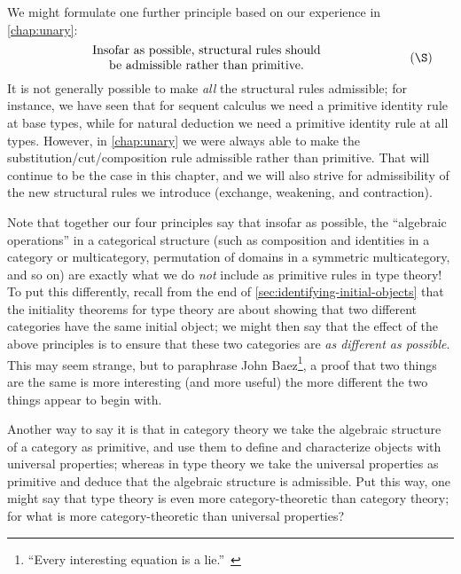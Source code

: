 \documentclass{book}
\begin{document}
We might formulate one further principle based on our experience in \cref{chap:unary}:
\begin{equation}\label{princ:adm}
  \parbox{4in}{\centering Insofar as possible, structural rules should\\ be admissible rather than primitive.}\tag{\S}
\end{equation}
It is not generally possible to make \emph{all} the structural rules admissible; for instance, we have seen that for sequent calculus we need a primitive identity rule at base types, while for natural deduction we need a primitive identity rule at all types.
However, in \cref{chap:unary} we were always able to make the substitution/cut/composition rule admissible rather than primitive.
That will continue to be the case in this chapter, and we will also strive for admissibility of the new structural rules we introduce (exchange, weakening, and contraction).

Note that together our four principles say that insofar as possible, the ``algebraic operations'' in a categorical structure (such as composition and identities in a category or multicategory, permutation of domains in a symmetric multicategory, and so on) are exactly what we do \emph{not} include as primitive rules in type theory!
To put this differently, recall from the end of \cref{sec:identifying-initial-objects} that the initiality theorems for type theory are about showing that two different categories have the same initial object; we might then say that the effect of the above principles is to ensure that these two categories are \emph{as different as possible}.
This may seem strange, but to paraphrase John Baez\footnote{``Every interesting equation is a lie.''~\cite{baez:why-ncats}}, a proof that two things are the same is more interesting (and more useful) the more different the two things appear to begin with.

Another way to say it is that in category theory we take the algebraic structure of a category as primitive, and use them to define and characterize objects with universal properties; whereas in type theory we take the universal properties as primitive and deduce that the algebraic structure is admissible.
Put this way, one might say that type theory is even more category-theoretic than category theory; for what is more category-theoretic than universal properties?
\end{document}
